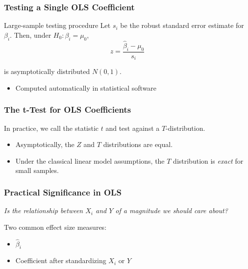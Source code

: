 \documentclass[12pt, block=fill]{beamer}
\begin{document}
\begin{frame}
  \frametitle{Testing a Single OLS Coefficient}
  \begin{block}{Large-sample testing procedure}
  Let $s_i$ be the robust standard error estimate for $\beta_i$.  Then, under $H_0: \beta_i = \mu_0$,
$$z = \frac{\hat \beta_i - \mu_0}{s_i}$$

is asymptotically distributed $N(0,1)$.  \end{block}

\begin{itemize}
\item Computed automatically in statistical software
\end{itemize}

\end{frame}




\begin{frame}
  \frametitle{The t-Test for OLS Coefficients}
  In practice, we call the statistic $t$ and test against a
  $T$-distribution. 
  \begin{itemize}
\item Asymptotically, the $Z$ and $T$ distributions are equal.
\item Under the classical linear model assumptions, the $T$
  distribution is \textit{exact} for small samples. 
\end{itemize}

\end{frame}



\begin{frame}
  \frametitle{Practical Significance in OLS}
  
  \textit{Is the relationship between $X_i$ and $Y$ of a magnitude we should care about?}
  \vspace{1cm}
  
  Two common effect size measures:
  \begin{itemize}
\item $\hat \beta_i$
\item Coefficient after standardizing $X_i$ or $Y$
\end{itemize}

\end{frame}
\end{document}
